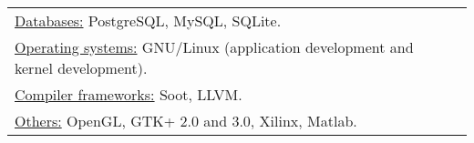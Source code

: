 \documentclass[margin]{res}
\begin{document}
\begin{resume}
\begin{tabular}{l p{3in}}
    \underline{Databases:} PostgreSQL, MySQL, SQLite. \\

    \underline{Operating systems:} GNU/Linux (application development
    and kernel development). \\

    \underline{Compiler frameworks:} Soot, LLVM. \\

    \underline{Others:} OpenGL, GTK+ 2.0 and 3.0, Xilinx, Matlab. \\
 \end{tabular}

\end{resume} 
\end{document}
